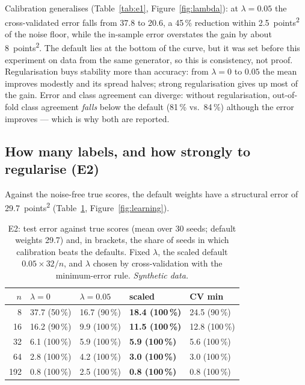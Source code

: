 \documentclass[10pt,twocolumn,a4paper]{article}
\newcommand{\synth}{\textit{Synthetic data.}}
\newcommand{\ptsq}{points\textsuperscript{2}}
\begin{document}
Calibration generalises (Table~\ref{tab:e1}, Figure~\ref{fig:lambda}): at $\lambda=0.05$
the cross-validated error falls from 37.8 to 20.6, a 45\,\% reduction within 2.5~\ptsq{}
of the noise floor, while the in-sample error overstates the gain by about 8~\ptsq. The
default lies at the bottom of the curve, but it was set before this experiment on data
from the same generator, so this is consistency, not proof. Regularisation buys stability
more than accuracy: from $\lambda=0$ to $0.05$ the mean improves modestly and its spread
halves; strong regularisation gives up most of the gain. Error and class agreement can
diverge: without regularisation, out-of-fold class agreement \emph{falls} below the
default (81\,\% vs.\ 84\,\%) although the error improves --- which is why both are
reported.

\subsection{How many labels, and how strongly to regularise (E2)}
\label{sec:e2}
Against the noise-free true scores, the default weights have a structural error of
29.7~\ptsq{} (Table~\ref{tab:e2}, Figure~\ref{fig:learning}).

\begin{table}[t]
  \caption{E2: test error against true scores (mean over 30 seeds; default weights 29.7)
  and, in brackets, the share of seeds in which calibration beats the defaults. Fixed
  $\lambda$, the scaled default $0.05\times32/n$, and $\lambda$ chosen by cross-validation
  with the minimum-error rule. \synth}
  \label{tab:e2}
  \small
  \setlength{\tabcolsep}{2.4pt}
  \begin{tabular}{@{}rllll@{}}
    \toprule
    $n$ & $\lambda=0$ & $\lambda=0.05$ & \textbf{scaled} & CV min \\
    \midrule
    8 & 37.7 (50\,\%) & 16.7 (90\,\%) & \textbf{18.4 (100\,\%)} & 24.5 (90\,\%) \\
    16 & 16.2 (90\,\%) & 9.9 (100\,\%) & \textbf{11.5 (100\,\%)} & 12.8 (100\,\%) \\
    32 & 6.1 (100\,\%) & 5.9 (100\,\%) & \textbf{5.9 (100\,\%)} & 5.6 (100\,\%) \\
    64 & 2.8 (100\,\%) & 4.2 (100\,\%) & \textbf{3.0 (100\,\%)} & 3.0 (100\,\%) \\
    192 & 0.8 (100\,\%) & 2.5 (100\,\%) & \textbf{0.8 (100\,\%)} & 0.8 (100\,\%) \\
    \bottomrule
  \end{tabular}
\end{table}
\end{document}
